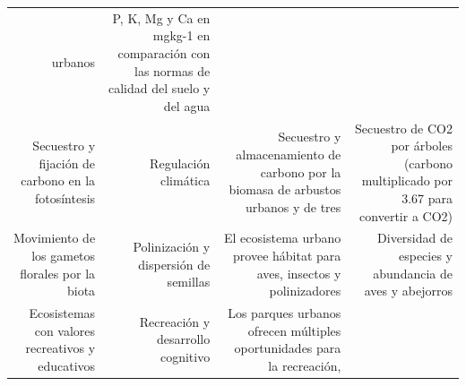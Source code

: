 \documentclass[12pt,]{book}
\begin{document}
\begin{longtable}[]{@{}rrrr@{}}
\begin{minipage}[t]{0.19\columnwidth}
urbanos\strut
\end{minipage} & \begin{minipage}[t]{0.22\columnwidth}\raggedleft\strut
P, K, Mg y Ca en mgkg-1 en comparación con las normas de calidad del
suelo y del agua\strut
\end{minipage}\tabularnewline
\begin{minipage}[t]{0.26\columnwidth}\raggedleft\strut
Secuestro y fijación de carbono en la fotosíntesis\strut
\end{minipage} & \begin{minipage}[t]{0.22\columnwidth}\raggedleft\strut
Regulación climática\strut
\end{minipage} & \begin{minipage}[t]{0.19\columnwidth}\raggedleft\strut
Secuestro y almacenamiento de carbono por la biomasa de arbustos urbanos
y de tres\strut
\end{minipage} & \begin{minipage}[t]{0.22\columnwidth}\raggedleft\strut
Secuestro de CO2 por árboles (carbono multiplicado por 3.67 para
convertir a CO2)\strut
\end{minipage}\tabularnewline
\begin{minipage}[t]{0.26\columnwidth}\raggedleft\strut
Movimiento de los gametos florales por la biota\strut
\end{minipage} & \begin{minipage}[t]{0.22\columnwidth}\raggedleft\strut
Polinización y dispersión de semillas\strut
\end{minipage} & \begin{minipage}[t]{0.19\columnwidth}\raggedleft\strut
El ecosistema urbano provee hábitat para aves, insectos y
polinizadores\strut
\end{minipage} & \begin{minipage}[t]{0.22\columnwidth}\raggedleft\strut
Diversidad de especies y abundancia de aves y abejorros\strut
\end{minipage}\tabularnewline
\begin{minipage}[t]{0.26\columnwidth}\raggedleft\strut
Ecosistemas con valores recreativos y educativos\strut
\end{minipage} & \begin{minipage}[t]{0.22\columnwidth}\raggedleft\strut
Recreación y desarrollo cognitivo\strut
\end{minipage} & \begin{minipage}[t]{0.19\columnwidth}\raggedleft\strut
Los parques urbanos ofrecen múltiples oportunidades para la recreación,

\end{minipage}
\end{longtable}
\end{document}
